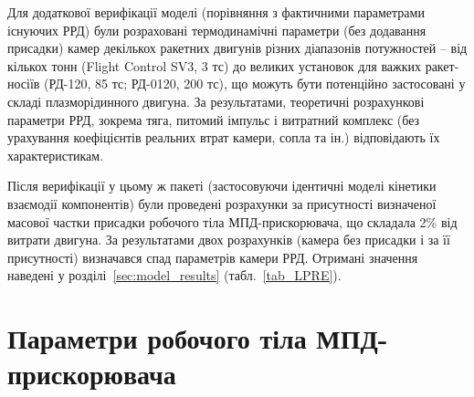 Для додаткової верифікації моделі (порівняння з фактичними параметрами існуючих РРД) були розраховані термодинамічні параметри (без додавання присадки) камер декількох ракетних двигунів різних діапазонів потужностей -- від кількох тонн (Flight Control SV3, 3 тс) до великих установок для важких ракет-носіїв (РД-120, 85 тс; РД-0120, 200 тс), що можуть бути потенційно застосовані у складі плазморідинного двигуна. За результатами, теоретичні розрахункові параметри РРД, зокрема тяга, питомий імпульс і витратний комплекс (без урахування коефіцієнтів реальних втрат камери, сопла та ін.) відповідають їх характеристикам.

Після верифікації у цьому ж пакеті (застосовуючи ідентичні моделі кінетики взаємодії компонентів) були проведені розрахунки за присутності визначеної масової частки присадки робочого тіла МПД-прискорювача, що складала 2\% від витрати двигуна. За результатами двох розрахунків (камера без присадки і за її присутності) визначався спад параметрів камери РРД. Отримані значення наведені у розділі~\ref{sec:model_results} (табл.~\ref{tab_LPRE}).






\section{Параметри робочого тіла МПД-прискорювача}


